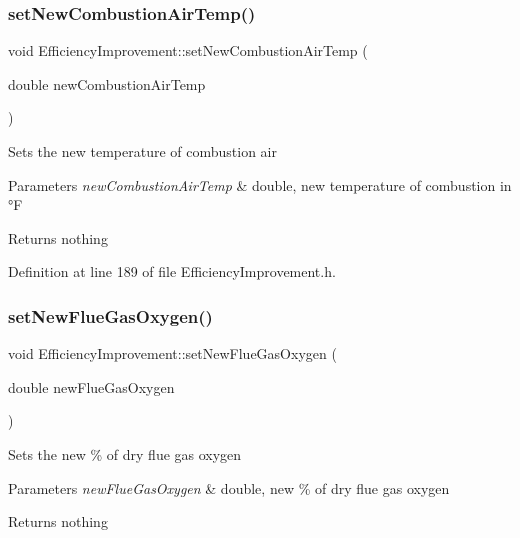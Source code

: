 \subsubsection{\texorpdfstring{set\+New\+Combustion\+Air\+Temp()}{setNewCombustionAirTemp()}\hspace{0.1cm}{\footnotesize\ttfamily [3/3]}}
{\footnotesize\ttfamily void Efficiency\+Improvement\+::set\+New\+Combustion\+Air\+Temp (\begin{DoxyParamCaption}\item[{double}]{new\+Combustion\+Air\+Temp }\end{DoxyParamCaption})\hspace{0.3cm}{\ttfamily [inline]}}

Sets the new temperature of combustion air


\begin{DoxyParams}{Parameters}
{\em new\+Combustion\+Air\+Temp} & double, new temperature of combustion in °F\\
\hline
\end{DoxyParams}
\begin{DoxyReturn}{Returns}
nothing 
\end{DoxyReturn}


Definition at line 189 of file Efficiency\+Improvement.\+h.

\mbox{\label{class_efficiency_improvement_a111f7e30d302b4e71103a2ec6d199e2c}} 
\subsubsection{\texorpdfstring{set\+New\+Flue\+Gas\+Oxygen()}{setNewFlueGasOxygen()}\hspace{0.1cm}{\footnotesize\ttfamily [1/3]}}
{\footnotesize\ttfamily void Efficiency\+Improvement\+::set\+New\+Flue\+Gas\+Oxygen (\begin{DoxyParamCaption}\item[{double}]{new\+Flue\+Gas\+Oxygen }\end{DoxyParamCaption})\hspace{0.3cm}{\ttfamily [inline]}}

Sets the new \% of dry flue gas oxygen


\begin{DoxyParams}{Parameters}
{\em new\+Flue\+Gas\+Oxygen} & double, new \% of dry flue gas oxygen\\
\hline
\end{DoxyParams}
\begin{DoxyReturn}{Returns}
nothing 
\end{DoxyReturn}


